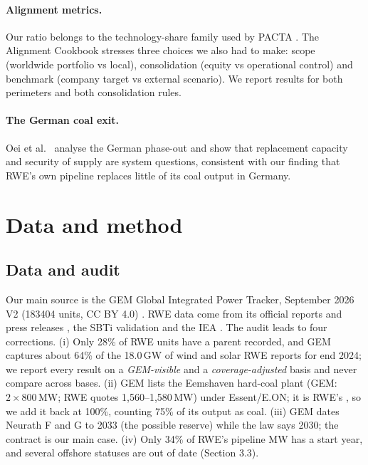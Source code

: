 \documentclass[11pt,a4paper]{article}
\begin{document}
\paragraph{Alignment metrics.} Our ratio belongs to the technology-share family used by PACTA \cite{pacta}. The Alignment Cookbook \cite{cookbook2020} stresses three choices we also had to make: scope (worldwide portfolio vs local), consolidation (equity vs operational control) and benchmark (company target vs external scenario). We report results for both perimeters and both consolidation rules.

\paragraph{The German coal exit.} Oei et al.\ \cite{oei2020} analyse the German phase-out and show that replacement capacity and security of supply are system questions, consistent with our finding that RWE's own pipeline replaces little of its coal output in Germany.

\section{Data and method}
\subsection{Data and audit}
Our main source is the GEM Global Integrated Power Tracker, September 2026 V2 (\num{183404} units, CC BY 4.0) \cite{gem2026}. RWE data come from its official reports and press releases \cite{rwefact2026,rwespr2023,rwe2024,rwe2025,rwe2026}, the SBTi validation \cite{sbti2025} and the IEA \cite{iea2025}. The audit leads to four corrections. (i) Only 28\% of RWE units have a parent recorded, and GEM captures about 64\% of the 18.0\,GW of wind and solar RWE reports for end 2024; we report every result on a \emph{GEM-visible} and a \emph{coverage-adjusted} basis and never compare across bases. (ii) GEM lists the Eemshaven hard-coal plant (GEM: $2\times800$\,MW; RWE quotes 1,560--1,580\,MW) under Essent/E.ON; it is RWE's \cite{rwebenelux}, so we add it back at 100\%, counting 75\% of its output as coal. (iii) GEM dates Neurath F and G to 2033 (the possible reserve) while the law says 2030; the contract is our main case. (iv) Only 34\% of RWE's pipeline MW has a start year, and several offshore statuses are out of date (Section 3.3).
\end{document}
